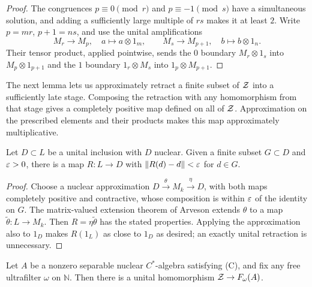\begin{proof}
The congruences $p\equiv0\pmod r$ and $p\equiv-1\pmod s$
have a simultaneous solution, and adding a sufficiently large multiple
of $rs$ makes it at least $2$.  Write $p=mr$, $p+1=ns$, and use
the unital amplifications
\[
 M_r\longrightarrow M_p,\quad a\longmapsto a\otimes1_m,
 \qquad
 M_s\longrightarrow M_{p+1},\quad b\longmapsto b\otimes1_n.
\]
Their tensor product, applied pointwise, sends the $0$ boundary
$M_r\otimes1_s$ into $M_p\otimes1_{p+1}$ and the $1$ boundary
$1_r\otimes M_s$ into $1_p\otimes M_{p+1}$.
\end{proof}

The next lemma lets us approximately retract a finite subset of $\mathcal Z$
into a sufficiently late stage. Composing the retraction with any
homomorphism from that stage gives a completely positive map defined
on all of $\mathcal Z$. Approximation on the prescribed elements and their
products makes this map approximately multiplicative.

\begin{lemma}\label{abs:approximate-retraction}
Let $D\subset L$ be a unital inclusion with $D$ nuclear.  Given a
finite subset $G\subset D$ and $\varepsilon>0$, there is a \cpc map
$R:L\to D$ with $\|R(d)-d\|<\varepsilon$ for $d\in G$.
\end{lemma}

\begin{proof}
Choose a nuclear approximation
$D\xrightarrow{\theta}M_k\xrightarrow{\eta}D$, with both maps
completely positive and contractive, whose composition is within
$\varepsilon$ of the identity on $G$.  The matrix-valued extension theorem
of Arveson \cite[Theorem~1.2.3]{Arveson1969} extends $\theta$ to a \cpc map
$\widetilde\theta:L\to M_k$.  Then
$R=\eta\widetilde\theta$ has the stated properties.  Applying the
approximation also to $1_D$ makes $R(1_L)$ as close to $1_D$ as
desired; an exactly unital retraction is unnecessary.
\end{proof}

\begin{proposition}\label{prop:Z-map}
Let $A$ be a nonzero separable nuclear $C^*$-algebra satisfying
\textup{(C)}, and fix any free ultrafilter $\omega$ on $\mathbb N$.
Then there is a unital homomorphism $\mathcal Z\to F_\omega(A)$.
\end{proposition}

